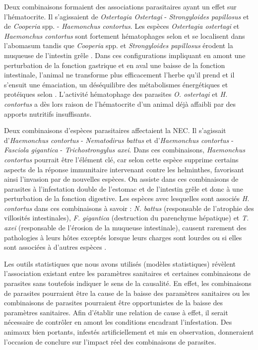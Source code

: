 \par Deux combinaisons formaient des associations parasitaires ayant un effet sur l’hématocrite. Il s’agissaient de \textit{Ostertagia Ostertagi} - \textit{Strongyloides papillosus} et de \textit{Cooperia} spp. - \textit{Haemonchus contortus}. Les espèces \textit{Ostertagia ostertagi} et \textit{Haemonchus contortus} sont fortement hématophages selon  et se localisent dans l’abomasum tandis que \textit{Cooperia} spp. et \textit{Strongyloides papillosus} érodent la muqueuse de l’intestin grêle . Dans ces configurations impliquant en amont une perturbation de la fonction gastrique et en aval une baisse de la fonction intestinale, l’animal ne transforme plus efficacement l’herbe qu’il prend et il s’ensuit une émaciation, un déséquilibre des métabolismes énergétiques et protéiques selon . L’activité hématophage des parasites \textit{O. ostertagi} et \textit{H. contortus} a dès lors raison de l’hématocrite d’un animal déjà affaibli par des apports nutritifs insuffisants.

\par Deux combinaisons d’espèces parasitaires affectaient la NEC. Il s’agissait d'\textit{Haemonchus contortus} - \textit{Nematodirus battus} et d'\textit{Haemonchus contortus} - \textit{Fasciola gigantica} - \textit{Trichostrongylus axei}. Dans ces combinaisons, \textit{Haemonchus contortus} pourrait être l’élément clé, car selon  cette espèce supprime certains aspects de la réponse immunitaire intervenant contre les helminthes, favorisant ainsi l’invasion par de nouvelles espèces. On assiste dans ces combinaisons de parasites à l’infestation double de l’estomac et de l’intestin grêle et donc à une perturbation de la fonction digestive. Les espèces avec lesquelles sont associés \textit{H. contortus} dans ces combinaisons à savoir : \textit{N. battus} (responsable de l'atrophie des villosités intestinales), \textit{F. gigantica} (destruction du parenchyme hépatique) et \textit{T. axei} (responsable de l’érosion de la muqueuse intestinale), causent rarement des pathologies à leurs hôtes exceptés lorsque leurs charges sont lourdes ou si elles sont associées à d’autres espèces .

\par Les outils statistiques que nous avons utilisés (modèles statistiques) révèlent l’association existant entre les paramètres sanitaires et certaines combinaisons de parasites sans toutefois indiquer le sens de la causalité. En effet, les combinaisons de parasites pourraient être la cause de la baisse des paramètres sanitaires ou les combinaisons de parasites pourraient être opportunistes de la baisse des paramètres sanitaires. Afin d’établir une relation de cause à effet, il serait nécessaire de contrôler en amont les conditions encadrant l’infestation. Des animaux bien portants, infestés artificiellement et mis en observation, donneraient l’occasion de conclure sur l’impact réel des combinaisons de parasites.
